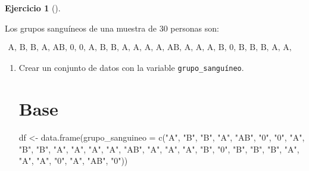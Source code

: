 \documentclass[
  spanish,
  a4paper,
]{scrreport}
\newenvironment{Shaded}{\begin{snugshade}}{\end{snugshade}}
\newcommand{\AttributeTok}[1]{\textcolor[rgb]{0.40,0.45,0.13}{#1}}
\newcommand{\FunctionTok}[1]{\textcolor[rgb]{0.28,0.35,0.67}{#1}}
\newcommand{\NormalTok}[1]{\textcolor[rgb]{0.00,0.23,0.31}{#1}}
\newcommand{\OtherTok}[1]{\textcolor[rgb]{0.00,0.23,0.31}{#1}}
\newcommand{\StringTok}[1]{\textcolor[rgb]{0.13,0.47,0.30}{#1}}
\theoremstyle{definition}
\newtheorem{exercise}{Ejercicio}[chapter]
\theoremstyle{remark}
\begin{document}
\begin{exercise}[]\protect\hypertarget{exr-frecuencias-graficos-grupo-sanguineo}{}\label{exr-frecuencias-graficos-grupo-sanguineo}

Los grupos sanguíneos de una muestra de 30 personas son:

\[
\begin{array}{c}
\mbox{A, B, B, A, AB, 0, 0, A, B, B, A, A, A, A, AB, A, A, A, B, 0, B, B, B, A, A, A, 0, A, AB, 0}
\end{array}
\]

\begin{enumerate}
\def\labelenumi{\alph{enumi}.}
\item
  Crear un conjunto de datos con la variable \texttt{grupo\_sanguíneo}.

  \begin{tcolorbox}[enhanced jigsaw, titlerule=0mm, arc=.35mm, rightrule=.15mm, opacitybacktitle=0.6, leftrule=.75mm, colframe=quarto-callout-tip-color-frame, toptitle=1mm, breakable, colbacktitle=quarto-callout-tip-color!10!white, bottomrule=.15mm, colback=white, left=2mm, bottomtitle=1mm, opacityback=0, title=\textcolor{quarto-callout-tip-color}{\faLightbulb}\hspace{0.5em}{Solución}, toprule=.15mm, coltitle=black]

  \section{Base}

\begin{Shaded}
\begin{Highlighting}[]
\NormalTok{df }\OtherTok{\textless{}{-}} \FunctionTok{data.frame}\NormalTok{(}\AttributeTok{grupo\_sanguineo =} \FunctionTok{c}\NormalTok{(}\StringTok{"A"}\NormalTok{, }\StringTok{"B"}\NormalTok{, }\StringTok{"B"}\NormalTok{, }\StringTok{"A"}\NormalTok{, }\StringTok{"AB"}\NormalTok{, }\StringTok{"0"}\NormalTok{, }\StringTok{"0"}\NormalTok{, }\StringTok{"A"}\NormalTok{, }\StringTok{"B"}\NormalTok{, }\StringTok{"B"}\NormalTok{, }\StringTok{"A"}\NormalTok{, }\StringTok{"A"}\NormalTok{, }\StringTok{"A"}\NormalTok{, }\StringTok{"A"}\NormalTok{, }\StringTok{"AB"}\NormalTok{, }\StringTok{"A"}\NormalTok{, }\StringTok{"A"}\NormalTok{, }\StringTok{"A"}\NormalTok{, }\StringTok{"B"}\NormalTok{, }\StringTok{"0"}\NormalTok{, }\StringTok{"B"}\NormalTok{, }\StringTok{"B"}\NormalTok{, }\StringTok{"B"}\NormalTok{, }\StringTok{"A"}\NormalTok{, }\StringTok{"A"}\NormalTok{, }\StringTok{"A"}\NormalTok{, }\StringTok{"0"}\NormalTok{, }\StringTok{"A"}\NormalTok{, }\StringTok{"AB"}\NormalTok{, }\StringTok{"0"}\NormalTok{))}
\end{Highlighting}
\end{Shaded}


\end{tcolorbox}
\end{enumerate}
\end{exercise}
\end{document}
